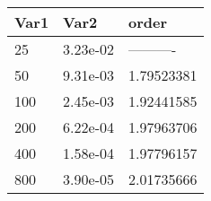 \begin{tabular}{lll}
Var1 & Var2 & order \\ 
\hline 
25 & 3.23e-02 & ---------- \\ 
50 & 9.31e-03 & 1.79523381 \\ 
100 & 2.45e-03 & 1.92441585 \\ 
200 & 6.22e-04 & 1.97963706 \\ 
400 & 1.58e-04 & 1.97796157 \\ 
800 & 3.90e-05 & 2.01735666 \\ 
\hline 
\end{tabular}